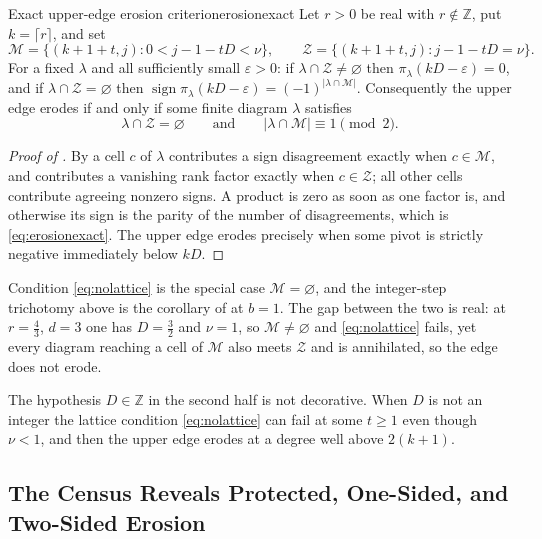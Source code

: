 \documentclass[11pt,letterpaper]{article}
\newcommand{\Zint}{\mathbb{Z}}
\begin{document}
\begin{proposition}{Exact upper-edge erosion criterion}{erosionexact}
Let $r>0$ be real with $r\notin\Zint$, put $k=\lceil r\rceil$, and set
\begin{equation}
  \mathcal{M}=\bigl\{(k+1+t,j):0<j-1-tD<\nu\bigr\},
  \qquad
  \mathcal{Z}=\bigl\{(k+1+t,j):j-1-tD=\nu\bigr\}.
  \label{eq:MZ}
\end{equation}
For a fixed $\lambda$ and all sufficiently small $\varepsilon>0$: if
$\lambda\cap\mathcal{Z}\ne\varnothing$ then $\pi_\lambda(kD-\varepsilon)=0$, and
if $\lambda\cap\mathcal{Z}=\varnothing$ then
$\operatorname{sign}\pi_\lambda(kD-\varepsilon)=(-1)^{|\lambda\cap\mathcal{M}|}$.
Consequently the upper edge erodes if and only if some finite diagram $\lambda$
satisfies
\begin{equation}
  \lambda\cap\mathcal{Z}=\varnothing
  \qquad\text{and}\qquad
  |\lambda\cap\mathcal{M}|\equiv1\!\!\pmod 2 .
  \label{eq:erosionexact}
\end{equation}
\end{proposition}

\begin{proof}[Proof of ]
By  a cell $c$ of $\lambda$ contributes a sign disagreement
exactly when $c\in\mathcal{M}$, and contributes a vanishing rank factor exactly
when $c\in\mathcal{Z}$; all other cells contribute agreeing nonzero signs. A
product is zero as soon as one factor is, and otherwise its sign is the parity of
the number of disagreements, which is \eqref{eq:erosionexact}. The upper edge
erodes precisely when some pivot is strictly negative immediately below $kD$.
\end{proof}

Condition \eqref{eq:nolattice} is the special case $\mathcal{M}=\varnothing$, and
the integer-step trichotomy above is the corollary of
 at $b=1$. The gap between the two is real: at
$r=\tfrac43$, $d=3$ one has $D=\tfrac32$ and $\nu=1$, so
$\mathcal{M}\ne\varnothing$ and \eqref{eq:nolattice} fails, yet every diagram
reaching a cell of $\mathcal{M}$ also meets $\mathcal{Z}$ and is annihilated, so
the edge does not erode.

The hypothesis $D\in\Zint$ in the second half is not decorative. When $D$ is not
an integer the lattice condition \eqref{eq:nolattice} can fail at some $t\ge1$
even though $\nu<1$, and then the upper edge erodes at a degree well above
$2(k+1)$.

\subsection{The Census Reveals Protected, One-Sided, and Two-Sided Erosion}
\label{sec:census}
\end{document}
